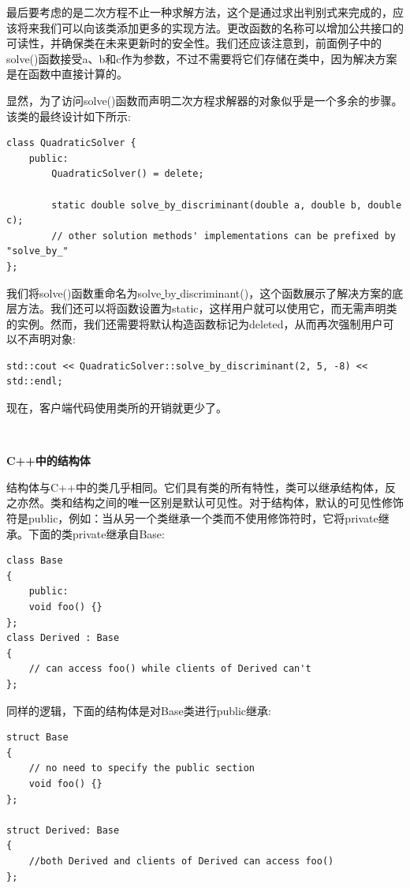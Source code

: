 最后要考虑的是二次方程不止一种求解方法，这个是通过求出判别式来完成的，应该将来我们可以向该类添加更多的实现方法。更改函数的名称可以增加公共接口的可读性，并确保类在未来更新时的安全性。我们还应该注意到，前面例子中的solve()函数接受a、b和c作为参数，不过不需要将它们存储在类中，因为解决方案是在函数中直接计算的。 \par
显然，为了访问solve()函数而声明二次方程求解器的对象似乎是一个多余的步骤。该类的最终设计如下所示: \par

\begin{lstlisting}[caption={}]
class QuadraticSolver {
	public:
		QuadraticSolver() = delete;
		
		static double solve_by_discriminant(double a, double b, double c);
		// other solution methods' implementations can be prefixed by "solve_by_"
};
\end{lstlisting}

我们将solve()函数重命名为solve\underline{ }by\underline{ }discriminant()，这个函数展示了解决方案的底层方法。我们还可以将函数设置为static，这样用户就可以使用它，而无需声明类的实例。然而，我们还需要将默认构造函数标记为deleted，从而再次强制用户可以不声明对象: \par

\begin{lstlisting}[caption={}]
std::cout << QuadraticSolver::solve_by_discriminant(2, 5, -8) << std::endl;
\end{lstlisting}

现在，客户端代码使用类所的开销就更少了。 \par

\noindent\textbf{}\ \par
\textbf{C++中的结构体} \ \par
结构体与C++中的类几乎相同。它们具有类的所有特性，类可以继承结构体，反之亦然。类和结构之间的唯一区别是默认可见性。对于结构体，默认的可见性修饰符是public，例如：当从另一个类继承一个类而不使用修饰符时，它将private继承。下面的类private继承自Base: \par

\begin{lstlisting}[caption={}]
class Base
{
	public:
	void foo() {}
};
class Derived : Base
{
	// can access foo() while clients of Derived can't
};
\end{lstlisting}

同样的逻辑，下面的结构体是对Base类进行public继承: \par

\begin{lstlisting}[caption={}]
struct Base
{
	// no need to specify the public section
	void foo() {}
};

struct Derived: Base
{
	//both Derived and clients of Derived can access foo()
};
\end{lstlisting}


